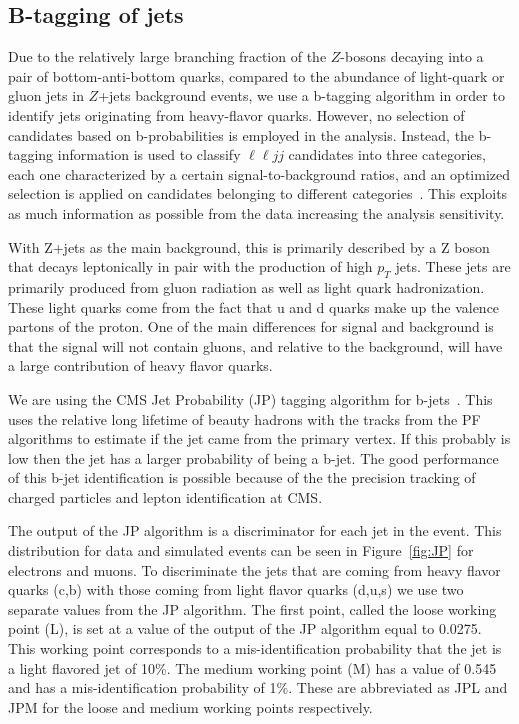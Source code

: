 \subsection{B-tagging of jets}
\label{subsec:btaggingofjets}
Due to the relatively large branching fraction of the $Z$-bosons decaying into a pair of bottom-anti-bottom quarks, compared to the abundance of light-quark or gluon jets in $Z$+jets background events, we use a b-tagging algorithm in order to identify jets originating from heavy-flavor quarks. However, no selection of candidates based on b-probabilities is employed in the analysis. Instead, the b-tagging information is used to classify $\ell \ell jj$ candidates into three categories, each one characterized by a certain signal-to-background ratios, and an optimized selection is applied on candidates belonging to different categories~\cite{CMS-AN-2011-399}. This exploits as much information as possible from the data increasing the analysis sensitivity.

With Z+jets as the main background, this is primarily described by a Z boson that decays leptonically in pair with the production of high $p_T$ jets. These jets are primarily produced from gluon radiation as well as light quark hadronization.  These light quarks come from the fact that u and d quarks make up the valence partons of the proton. One of the main differences for signal and background is that the signal will not contain gluons, and relative to the background, will have a large contribution of heavy flavor quarks.

We are using the CMS Jet Probability (JP) tagging algorithm for b-jets~\cite{CMS-PAS-BTV-11-004}.  This uses the relative long lifetime of beauty hadrons with the tracks from the PF algorithms to estimate if the jet came from the primary vertex.  If this probably is low then the jet has a larger probability of being a b-jet.  The good performance of this b-jet identification is possible because of the the precision tracking of charged particles and lepton identification at CMS.

The output of the JP algorithm is a discriminator for each jet in the event.  This distribution for data and simulated events can be seen in Figure~\ref{fig:JP} for electrons and muons.  To discriminate the jets that are coming from heavy flavor quarks (c,b) with those coming from light flavor quarks (d,u,s) we use two separate values from the JP algorithm.  The first point, called the loose working point (L), is set at a value of the output of the JP algorithm equal to 0.0275. This working point corresponds to a mis-identification probability that the jet is a light flavored jet of 10\%.  The medium working point (M) has a value of 0.545 and has a mis-identification probability of 1\%.  These are abbreviated as JPL and JPM for the loose and medium working points respectively.


